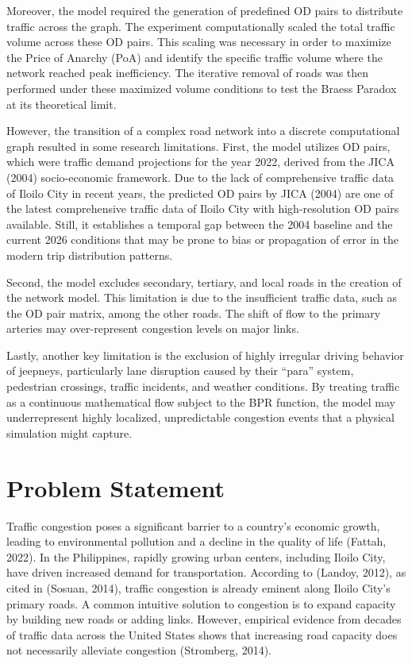 Moreover, the model required the generation of predefined OD pairs to distribute traffic across the graph. The experiment computationally scaled the total traffic volume across these OD pairs. This scaling was necessary in order to maximize the Price of Anarchy (PoA) and identify the specific traffic volume where the network reached peak inefficiency. The iterative removal of roads was then performed under these maximized volume conditions to test the Braess Paradox at its theoretical limit.

 However, the transition of a complex road network into a discrete computational graph resulted in some research limitations. First, the model utilizes OD pairs, which were traffic demand projections for the year 2022, derived from the JICA (2004) socio-economic framework. Due to the lack of comprehensive traffic data of Iloilo City in recent years, the predicted OD pairs by JICA (2004) are one of the latest comprehensive traffic data of Iloilo City with high-resolution OD pairs available. Still, it establishes a temporal gap between the 2004 baseline and the current 2026 conditions that may be prone to bias or propagation of error in the modern trip distribution patterns.

 Second, the model excludes secondary, tertiary, and local roads in the creation of the network model. This limitation is due to the insufficient traffic data, such as the OD pair matrix, among the other roads. The shift of flow to the primary arteries may over-represent congestion levels on major links.

 Lastly, another key limitation is the exclusion of highly irregular driving behavior of jeepneys, particularly lane disruption caused by their “para” system, pedestrian crossings, traffic incidents, and weather conditions. By treating traffic as a continuous mathematical flow subject to the BPR function, the model may underrepresent highly localized, unpredictable congestion events that a physical simulation might capture.

\section{Problem Statement}
\label{sec:problem_statement}

Traffic congestion poses a significant barrier to a country's economic growth, leading to environmental pollution and a decline in the quality of life (Fattah, 2022). In the Philippines, rapidly growing urban centers, including Iloilo City, have driven increased demand for transportation. According to (Landoy, 2012), as cited in (Sosuan, 2014), traffic congestion is already eminent along Iloilo City's primary roads. A common intuitive solution to congestion is to expand capacity by building new roads or adding links. However, empirical evidence from decades of traffic data across the United States shows that increasing road capacity does not necessarily alleviate congestion (Stromberg, 2014). 

